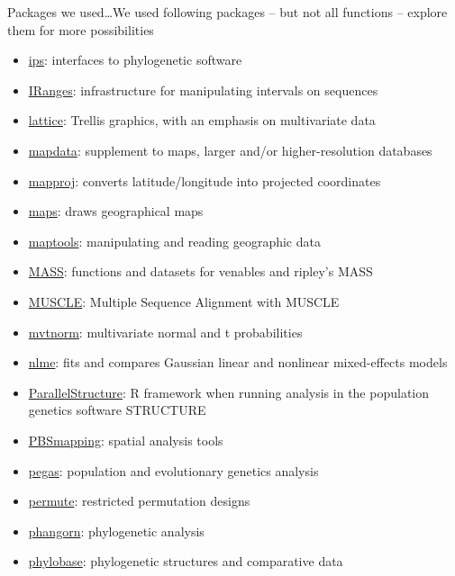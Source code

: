 \documentclass[compress, ucs, xelatex, 11pt, xcolor=svgnames,
  hyperref={
    bookmarks=true,
    unicode=true,
    colorlinks=true,
    pdftitle={Molecular data in R},
    plainpages=false,
    pdfauthor={Vojtech Zeisek},
    pdfsubject={Course about phylogeny and evolution in R},
    pdfcreator={XeLaTeX},
    pdfkeywords={R, evolution, phylogeny, molecular data},
    linkcolor=Tomato,
    anchorcolor=SaddleBrown,
    citecolor=Goldenrod,
    filecolor=DarkMagenta,
    menucolor=Sienna,
    urlcolor=DarkTurquoise,
    pdftex},
  url={hyphens, lowtilde} %
  ]{beamer}
\begin{document}
\begin{frame}[allowframebreaks]{Packages we used\ldots}{We used following packages -- but not all functions -- explore them for more possibilities}
\begin{itemize}
    \item \href{https://cran.r-project.org/package=ips}{ips}: interfaces to phylogenetic software
    \item \href{https://www.bioconductor.org/packages/3.4/bioc/html/IRanges.html}{IRanges}: infrastructure for manipulating intervals on sequences
    \item \href{https://cran.r-project.org/package=lattice}{lattice}: Trellis graphics, with an emphasis on multivariate data
    \item \href{https://cran.r-project.org/package=mapdata}{mapdata}: supplement to maps, larger and/or higher-resolution databases
    \item \href{https://cran.r-project.org/package=mapproj}{mapproj}: converts latitude/longitude into projected coordinates
    \item \href{https://cran.r-project.org/package=maps}{maps}: draws geographical maps
    \item \href{https://cran.r-project.org/package=maptools}{maptools}: manipulating and reading geographic data
    \item \href{https://cran.r-project.org/package=MASS}{MASS}: functions and datasets for venables and ripley's MASS
    \item \href{https://www.bioconductor.org/packages/3.4/bioc/html/muscle.html}{MUSCLE}: Multiple Sequence Alignment with MUSCLE
    \item \href{https://cran.r-project.org/package=mvtnorm}{mvtnorm}: multivariate normal and t probabilities
    \item \href{https://cran.r-project.org/package=nlme}{nlme}: fits and compares Gaussian linear and nonlinear mixed-effects models
    \item \href{https://r-forge.r-project.org/projects/parallstructure/}{ParallelStructure}: R framework when running analysis in the population genetics software STRUCTURE
    \item \href{https://cran.r-project.org/package=PBSmapping}{PBSmapping}: spatial analysis tools
    \item \href{https://cran.r-project.org/package=pegas}{pegas}: population and evolutionary genetics analysis
    \item \href{https://cran.r-project.org/package=permute}{permute}: restricted permutation designs
    \item \href{https://cran.r-project.org/package=phangorn}{phangorn}: phylogenetic analysis
    \item \href{https://cran.r-project.org/package=phylobase}{phylobase}: phylogenetic structures and comparative data

\end{itemize}
\end{frame}
\end{document}
